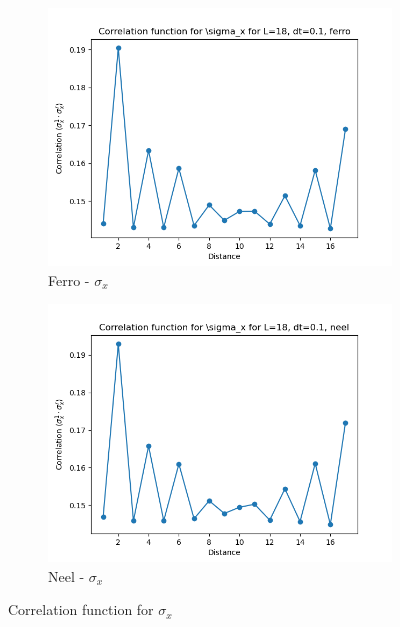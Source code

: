 \documentclass[12pt]{article}
\begin{document}
\begin{figure}[h!]
  \centering
  \begin{subfigure}[b]{0.4\textwidth}
    \includegraphics[width=\textwidth]{p4_1_correlation_sigma_x_L_18_dt_0.1_name_ferro.png}
    \caption{Ferro - $\sigma_x$}
  \end{subfigure}
  \hfill
  \begin{subfigure}[b]{0.4\textwidth}
    \includegraphics[width=\textwidth]{p4_1_correlation_sigma_x_L_18_dt_0.1_name_neel.png}
    \caption{Neel - $\sigma_x$}
  \end{subfigure}
  \caption{Correlation function for $\sigma_x$}
\end{figure}
\end{document}
